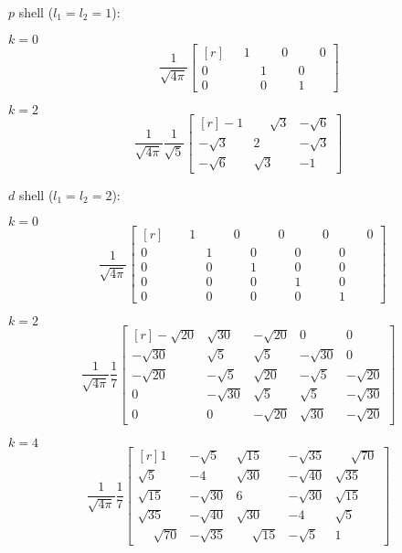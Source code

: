 $p$ shell ($l_1=l_2=1$):

$k=0$
\begin{equation}
\phantom{\frac{1}{\sqrt{5}}} \frac{1}{\sqrt{4\pi}}
\begin{bmatrix*}[r]
\phantom{000}1 & \,\phantom{000}0 & \,\phantom{000}0 \\
0 & 1 & 0 \\
0 & 0 & 1
\end{bmatrix*}
\end{equation}

$k=2$
\begin{equation}
\frac{1}{\sqrt{4\pi}} \frac{1}{\sqrt{5}}
\begin{bmatrix*}[r]
-1 & \phantom{-}\sqrt{3} & -\sqrt{6} \\
-\sqrt{3} & 2 & -\sqrt{3} \\
-\sqrt{6} & \sqrt{3} & -1
\end{bmatrix*}
\end{equation}

$d$ shell ($l_1=l_2=2$):

$k=0$
\begin{equation}
\phantom{\frac{1}{7}} \frac{1}{\sqrt{4\pi}}
\begin{bmatrix*}[r]
\phantom{0000}1 & \,\phantom{0000}0 & \,\phantom{0000}0 & \,\phantom{0000}0 & \,\phantom{0000}0 \\
0 & 1 & 0 & 0 & 0 \\
0 & 0 & 1 & 0 & 0 \\
0 & 0 & 0 & 1 & 0 \\
0 & 0 & 0 & 0 & 1
\end{bmatrix*}
\end{equation}

$k=2$
\begin{equation}
\frac{1}{\sqrt{4\pi}} \frac{1}{7}
\begin{bmatrix*}[r]
-\sqrt{20} & \sqrt{30} & -\sqrt{20} & 0 & 0 \\ 
-\sqrt{30} & \sqrt{5} & \sqrt{5} & -\sqrt{30} & 0 \\ 
-\sqrt{20} & -\sqrt{5} & \sqrt{20} & -\sqrt{5} & -\sqrt{20} \\ 
0 & -\sqrt{30} & \sqrt{5} & \sqrt{5} & -\sqrt{30} \\ 
0 & 0 & -\sqrt{20} & \sqrt{30} & -\sqrt{20}
\end{bmatrix*}
\end{equation}

$k=4$
\begin{equation}
\frac{1}{\sqrt{4\pi}} \frac{1}{7}
\begin{bmatrix*}[r]
1 & -\sqrt{5} & \sqrt{15} & -\sqrt{35} & \phantom{-}\sqrt{70} \\ 
\sqrt{5} & -4 & \sqrt{30} & -\sqrt{40} & \sqrt{35} \\ 
\sqrt{15} & -\sqrt{30} & 6 & -\sqrt{30} & \sqrt{15} \\ 
\sqrt{35} & -\sqrt{40} & \sqrt{30} & -4 & \sqrt{5} \\ 
\phantom{-}\sqrt{70} & -\sqrt{35} & \phantom{-}\sqrt{15} & -\sqrt{5} & 1
\end{bmatrix*}
\end{equation}

